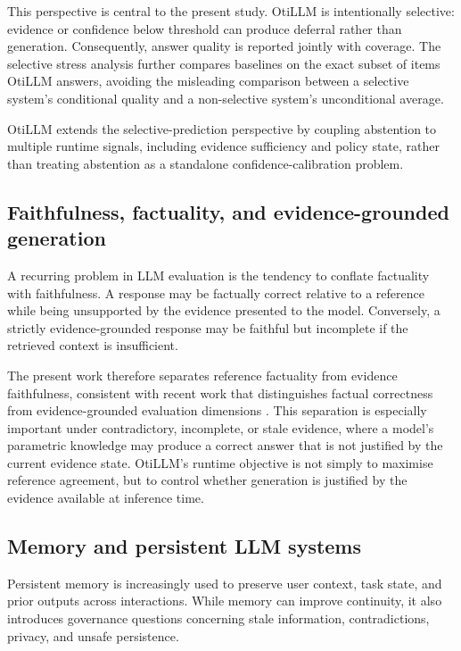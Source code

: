 \documentclass[manuscript, screen, review]{jair}
\begin{document}
This perspective is central to the present study. OtiLLM is intentionally
selective: evidence or confidence below threshold can produce deferral rather
than generation. Consequently, answer quality is reported jointly with
coverage. The selective stress analysis further compares baselines on the exact
subset of items OtiLLM answers, avoiding the misleading comparison between a
selective system's conditional quality and a non-selective system's
unconditional average.

OtiLLM extends the selective-prediction perspective by coupling abstention to
multiple runtime signals, including evidence sufficiency and policy state,
rather than treating abstention as a standalone confidence-calibration problem.

\subsection{Faithfulness, factuality, and evidence-grounded generation}

A recurring problem in LLM evaluation is the tendency to conflate factuality
with faithfulness. A response may be factually correct relative to a reference
while being unsupported by the evidence presented to the model. Conversely, a
strictly evidence-grounded response may be faithful but incomplete if the
retrieved context is insufficient.

The present work therefore separates reference factuality from evidence
faithfulness, consistent with recent work that distinguishes factual correctness from evidence-grounded evaluation dimensions \citep{wang2024factuality,es2024ragas}. This separation is especially important under contradictory,
incomplete, or stale evidence, where a model's parametric knowledge may produce
a correct answer that is not justified by the current evidence state. OtiLLM's
runtime objective is not simply to maximise reference agreement, but to control
whether generation is justified by the evidence available at inference time.

\subsection{Memory and persistent LLM systems}

Persistent memory is increasingly used to preserve user context, task state,
and prior outputs across interactions. While memory can improve continuity, it
also introduces governance questions concerning stale information,
contradictions, privacy, and unsafe persistence.
\end{document}
